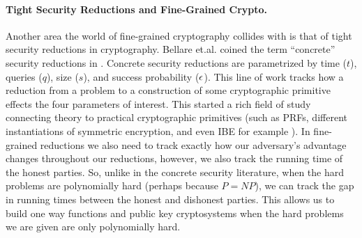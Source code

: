 \paragraph{Tight Security Reductions and Fine-Grained Crypto.}
Another area the world of fine-grained cryptography collides with is that of tight security reductions in cryptography. Bellare et.al. coined the term ``concrete'' security reductions in \cite{BellareKR94,BellareGR95}. Concrete security reductions are parametrized by time ($t$), queries ($q$), size ($s$), and success probability ($\epsilon$). 
This line of work tracks how a reduction from a problem to a  construction of some cryptographic primitive effects the four parameters of interest.  
This started a rich field of study connecting theory to practical cryptographic primitives (such as PRFs, different instantiations of symmetric encryption, and even IBE for example \cite{BellareCK96,BellareDJR97,KatzW03,BellareR09}). %
In fine-grained reductions we also need to track exactly how our adversary's advantage changes throughout our reductions, however, we also track the running time of the honest parties. %
So, unlike in the concrete security literature, when the hard problems are polynomially hard (perhaps because $P=NP$), we can track the gap in running times between the honest and dishonest parties. This allows us to build one way functions and public key cryptosystems when the hard problems we are given are only polynomially hard. 

\vspace{-0.5cm}

